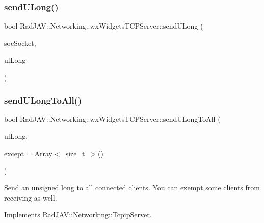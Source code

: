 \subsubsection{\texorpdfstring{send\+U\+Long()}{sendULong()}}
{\footnotesize\ttfamily bool Rad\+J\+A\+V\+::\+Networking\+::wx\+Widgets\+T\+C\+P\+Server\+::send\+U\+Long (\begin{DoxyParamCaption}\item[{wx\+Socket\+Base $\ast$}]{soc\+Socket,  }\item[{unsigned long}]{ul\+Long }\end{DoxyParamCaption})}

\mbox{\label{class_rad_j_a_v_1_1_networking_1_1wx_widgets_t_c_p_server_a07781e7fc1863045a08a2305ef26ff6c}} 
\subsubsection{\texorpdfstring{send\+U\+Long\+To\+All()}{sendULongToAll()}}
{\footnotesize\ttfamily bool Rad\+J\+A\+V\+::\+Networking\+::wx\+Widgets\+T\+C\+P\+Server\+::send\+U\+Long\+To\+All (\begin{DoxyParamCaption}\item[{unsigned long}]{ul\+Long,  }\item[{\mbox{\hyperlink{class_rad_j_a_v_1_1_array}{Array}}$<$ size\+\_\+t $>$}]{except = {\ttfamily \mbox{\hyperlink{class_rad_j_a_v_1_1_array}{Array}}$<$~size\+\_\+t~$>$()} }\end{DoxyParamCaption})\hspace{0.3cm}{\ttfamily [virtual]}}

Send an unsigned long to all connected clients. You can exempt some clients from receiving as well. 

Implements \mbox{\hyperlink{class_rad_j_a_v_1_1_networking_1_1_tcpip_server_a3a7c5f60b92fd1cf44f7b2dcc95dd853}{Rad\+J\+A\+V\+::\+Networking\+::\+Tcpip\+Server}}.

\mbox{\label{class_rad_j_a_v_1_1_networking_1_1wx_widgets_t_c_p_server_ab0c0c636b5b9eedba7402d18f177005d}} 
